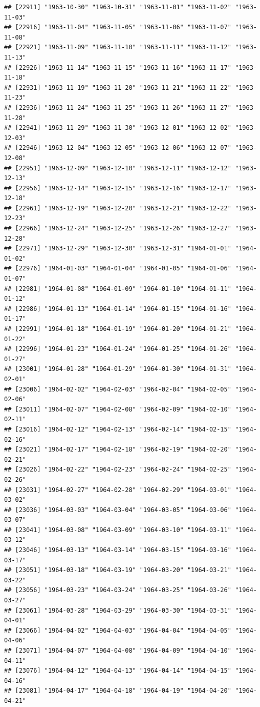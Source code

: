 \documentclass{article}\usepackage[]{graphicx}\usepackage[]{color}
\makeatletter
\newenvironment{kframe}{%
 \def\at@end@of@kframe{}%
 \ifinner\ifhmode%
  \def\at@end@of@kframe{\end{minipage}}%
  \begin{minipage}{\columnwidth}%
 \fi\fi%
 \def\FrameCommand##1{\hskip\@totalleftmargin \hskip-\fboxsep
 \colorbox{shadecolor}{##1}\hskip-\fboxsep
     \hskip-\linewidth \hskip-\@totalleftmargin \hskip\columnwidth}%
 \MakeFramed {\advance\hsize-\width
   \@totalleftmargin\z@ \linewidth\hsize
   \@setminipage}}%
 {\par\unskip\endMakeFramed%
 \at@end@of@kframe}
\newenvironment{knitrout}{}{} %
\makeatother
\begin{document}
\begin{description}
\begin{knitrout}
\begin{kframe}
\begin{verbatim}
## [22911] "1963-10-30" "1963-10-31" "1963-11-01" "1963-11-02" "1963-11-03"
## [22916] "1963-11-04" "1963-11-05" "1963-11-06" "1963-11-07" "1963-11-08"
## [22921] "1963-11-09" "1963-11-10" "1963-11-11" "1963-11-12" "1963-11-13"
## [22926] "1963-11-14" "1963-11-15" "1963-11-16" "1963-11-17" "1963-11-18"
## [22931] "1963-11-19" "1963-11-20" "1963-11-21" "1963-11-22" "1963-11-23"
## [22936] "1963-11-24" "1963-11-25" "1963-11-26" "1963-11-27" "1963-11-28"
## [22941] "1963-11-29" "1963-11-30" "1963-12-01" "1963-12-02" "1963-12-03"
## [22946] "1963-12-04" "1963-12-05" "1963-12-06" "1963-12-07" "1963-12-08"
## [22951] "1963-12-09" "1963-12-10" "1963-12-11" "1963-12-12" "1963-12-13"
## [22956] "1963-12-14" "1963-12-15" "1963-12-16" "1963-12-17" "1963-12-18"
## [22961] "1963-12-19" "1963-12-20" "1963-12-21" "1963-12-22" "1963-12-23"
## [22966] "1963-12-24" "1963-12-25" "1963-12-26" "1963-12-27" "1963-12-28"
## [22971] "1963-12-29" "1963-12-30" "1963-12-31" "1964-01-01" "1964-01-02"
## [22976] "1964-01-03" "1964-01-04" "1964-01-05" "1964-01-06" "1964-01-07"
## [22981] "1964-01-08" "1964-01-09" "1964-01-10" "1964-01-11" "1964-01-12"
## [22986] "1964-01-13" "1964-01-14" "1964-01-15" "1964-01-16" "1964-01-17"
## [22991] "1964-01-18" "1964-01-19" "1964-01-20" "1964-01-21" "1964-01-22"
## [22996] "1964-01-23" "1964-01-24" "1964-01-25" "1964-01-26" "1964-01-27"
## [23001] "1964-01-28" "1964-01-29" "1964-01-30" "1964-01-31" "1964-02-01"
## [23006] "1964-02-02" "1964-02-03" "1964-02-04" "1964-02-05" "1964-02-06"
## [23011] "1964-02-07" "1964-02-08" "1964-02-09" "1964-02-10" "1964-02-11"
## [23016] "1964-02-12" "1964-02-13" "1964-02-14" "1964-02-15" "1964-02-16"
## [23021] "1964-02-17" "1964-02-18" "1964-02-19" "1964-02-20" "1964-02-21"
## [23026] "1964-02-22" "1964-02-23" "1964-02-24" "1964-02-25" "1964-02-26"
## [23031] "1964-02-27" "1964-02-28" "1964-02-29" "1964-03-01" "1964-03-02"
## [23036] "1964-03-03" "1964-03-04" "1964-03-05" "1964-03-06" "1964-03-07"
## [23041] "1964-03-08" "1964-03-09" "1964-03-10" "1964-03-11" "1964-03-12"
## [23046] "1964-03-13" "1964-03-14" "1964-03-15" "1964-03-16" "1964-03-17"
## [23051] "1964-03-18" "1964-03-19" "1964-03-20" "1964-03-21" "1964-03-22"
## [23056] "1964-03-23" "1964-03-24" "1964-03-25" "1964-03-26" "1964-03-27"
## [23061] "1964-03-28" "1964-03-29" "1964-03-30" "1964-03-31" "1964-04-01"
## [23066] "1964-04-02" "1964-04-03" "1964-04-04" "1964-04-05" "1964-04-06"
## [23071] "1964-04-07" "1964-04-08" "1964-04-09" "1964-04-10" "1964-04-11"
## [23076] "1964-04-12" "1964-04-13" "1964-04-14" "1964-04-15" "1964-04-16"
## [23081] "1964-04-17" "1964-04-18" "1964-04-19" "1964-04-20" "1964-04-21"

\end{verbatim}
\end{kframe}
\end{knitrout}
\end{description}
\end{document}
